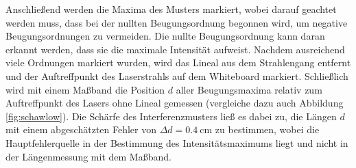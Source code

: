 \documentclass[11pt, a4paper]{article}
\numberwithin{equation}{section}
\begin{document}
Anschließend werden die Maxima des Musters markiert, wobei darauf geachtet werden muss, dass bei der nullten Beugungsordnung begonnen wird, um negative Beugungsordnungen zu vermeiden.
Die nullte Beugungsordnung kann daran erkannt werden, dass sie die maximale Intensität aufweist.
Nachdem ausreichend viele Ordnungen markiert wurden, wird das Lineal aus dem Strahlengang entfernt und der Auftreffpunkt des Laserstrahls auf dem Whiteboard markiert.
Schließlich wird mit einem Maßband die Position $d$ aller Beugungsmaxima relativ zum Auftreffpunkt des Lasers ohne Lineal gemessen (vergleiche dazu auch Abbildung \ref{fig:schawlow}).
Die Schärfe des Interferenzmusters ließ es dabei zu, die Längen $d$ mit einem abgeschätzten Fehler von $\Delta d = \SI{0.4}{\centi\metre}$ zu bestimmen, wobei die Hauptfehlerquelle in der Bestimmung des Intensitätsmaximums liegt und nicht in der Längenmessung mit dem Maßband.
\end{document}
